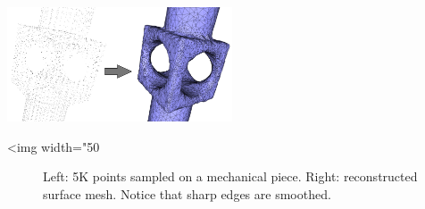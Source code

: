 \begin{center}
    \label{Surface_reconstruction_points_3-fig-sharp_features}
    \begin{ccTexOnly}
      \includegraphics[width=0.5\textwidth]{Surface_reconstruction_points_3/sharp_features} %
    \end{ccTexOnly}
    \begin{ccHtmlOnly}
        <img width="50%
    \end{ccHtmlOnly}
    \begin{figure}[h]
        \caption{Left: 5K points sampled on a mechanical piece.
                 Right: reconstructed surface mesh. Notice that sharp edges are smoothed.}
    \end{figure}
\end{center}




